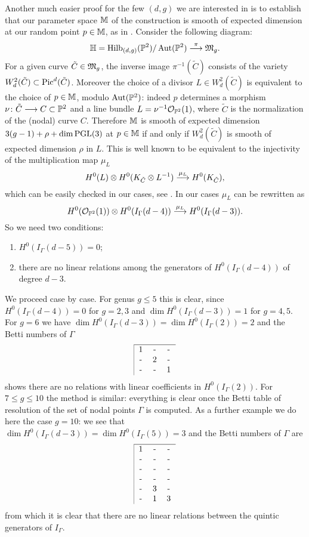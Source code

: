 Another much easier proof for the few $(d,g)$ we are interested in is to
establish that our parameter space ${\mathbb M}$ of the construction is smooth of 
expected dimension at our random point $p \in {\mathbb M}$, as in \cite{CO:AC}.
Consider the following diagram:
$${\mathbb H} = {\rm{Hilb}}_{(d,g)}({\mathbb P}^2)/\operatorname{Aut}({\mathbb P}^2) \stackrel{\pi}{\longrightarrow} \mathfrak M_g.$$
For a given curve ${\tilde C}\in\mathfrak M_g$, the inverse image $\pi^{-1} ({\tilde C})$ 
consists of the variety $W^2_d({\tilde C})\subset{\rm{Pic}}^d({\tilde C})$.
Moreover the choice of a divisor $L\in W^2_d({\tilde C})$ is equivalent to the 
choice of $p \in {\mathbb M}$, modulo $\operatorname{Aut}({\mathbb P}^2)$: 
indeed $p$ determines a morphism $\nu\colon {\tilde C} \longrightarrow C\subset {\mathbb P}^2$ 
and a line bundle $L=\nu^{-1}{\mathcal O}_{{\mathbb P}^2}(1)$, where ${\tilde C}$ is the 
normalization of the (nodal) curve $C$.
Therefore ${\mathbb M}$ is smooth of expected dimension $3(g-1)+\rho+\dim \operatorname{PGL}(3)$
at $p \in {\mathbb M}$ 
if and only if $W^2_d({\tilde C})$ is smooth of expected dimension $\rho$ in $L$.
This is well known to be equivalent to the injectivity of the multiplication map
$\mu_L$
$$
H^0(L)\otimes H^0(K_{\tilde C}\otimes L^{-1}) \stackrel{\mu_L}{\longrightarrow}H^0(K_{\tilde C}),
$$
which can be easily checked in our cases,
see \cite[p. 189]{CO:ACGH}.
In our cases $\mu_L$ can be rewritten as 
$$
H^0({\mathcal O}_{{\mathbb P}^2}(1))\otimes H^0(I_\Gamma(d-4)) \stackrel{\mu_L}{\longrightarrow}
H^0(I_\Gamma(d-3)).
$$
So we need two conditions: 
\begin{enumerate}
\item $H^0(I_\Gamma(d-5))=0$;
\item there are no linear relations among the generators of $H^0(I_\Gamma(d-4))$ of 
degree $d-3$.
\end{enumerate}
We proceed case by case.
For genus $g\leq 5$ this is clear, since $H^0(I_\Gamma(d-4))=0$ for $g=2,3$ and
$\dim H^0(I_\Gamma(d-3))=1$ for $g=4,5$. 
For $g=6$ we have $\dim H^0(I_\Gamma(d-3))= \dim H^0(I_\Gamma(2))=2$ and 
the Betti numbers of $\Gamma$ 
$$
\begin{tabular}{|ccc}\hline
1 & - & - \cr
- & 2 & - \cr
- & - & 1 \cr
\end{tabular}
$$
shows there are no relations 
with linear coefficients in $H^0(I_\Gamma(2))$.
For $7\leq g \leq 10$ the method is similar:
everything is clear once the Betti table of resolution of the set of nodal points 
$\Gamma$ is computed. As a further example we do here the case $g=10$: we see that
$\dim H^0(I_\Gamma(d-3))=\dim H^0(I_\Gamma(5))=3$ and the Betti numbers of $\Gamma$ are
$$
\begin{tabular}{|ccc}\hline
1 & - & - \cr
- & - & - \cr
- & - & - \cr
- & - & - \cr
- & 3 & - \cr
- & 1 & 3 \cr
\end{tabular}
$$
from which it is clear that there are no linear relations between the quintic generators
of $I_\Gamma$.

